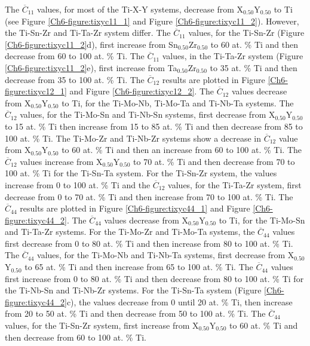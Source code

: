 The $\overline{C}_{11}$ values, for most of the Ti-X-Y systems, decrease from X$_{0.50}$Y$_{0.50}$ to Ti (see Figure \ref{Ch6-figure:tixyc11_1} and Figure \ref{Ch6-figure:tixyc11_2}). However, the Ti-Sn-Zr and Ti-Ta-Zr system differ. The $\overline{C}_{11}$ values, for the Ti-Sn-Zr (Figure \ref{Ch6-figure:tixyc11_2}d), first increase from Sn$_{0.50}$Zr$_{0.50}$ to 60 at. \% Ti and then decrease from 60 to 100 at. \% Ti. The $\overline{C}_{11}$ values, in the Ti-Ta-Zr system (Figure \ref{Ch6-figure:tixyc11_2}e), first increase from Ta$_{0.50}$Zr$_{0.50}$ to 35 at. \% Ti and then decrease from 35 to 100 at. \% Ti. The $\overline{C}_{12}$ results are plotted in Figure \ref{Ch6-figure:tixyc12_1} and Figure \ref{Ch6-figure:tixyc12_2}. The $\overline{C}_{12}$ values decrease from X$_{0.50}$Y$_{0.50}$ to Ti, for the Ti-Mo-Nb, Ti-Mo-Ta and Ti-Nb-Ta systems. The $\overline{C}_{12}$ values, for the Ti-Mo-Sn and Ti-Nb-Sn systems, first decrease from X$_{0.50}$Y$_{0.50}$ to 15 at. \% Ti then increase from 15 to 85 at. \% Ti and then decrease from 85 to 100 at. \% Ti. The Ti-Mo-Zr and Ti-Nb-Zr systems show a decrease in $\overline{C}_{12}$ value from X$_{0.50}$Y$_{0.50}$ to 60 at. \% Ti and then an increase from 60 to 100 at. \% Ti. The $\overline{C}_{12}$ values increase from X$_{0.50}$Y$_{0.50}$ to 70 at. \% Ti and then decrease from 70 to 100 at. \% Ti for the Ti-Sn-Ta system. For the Ti-Sn-Zr system, the values increase from 0 to 100 at. \% Ti and the $\overline{C}_{12}$ values, for the Ti-Ta-Zr system, first decrease from 0 to 70 at. \% Ti and then increase from 70 to 100 at. \% Ti. The $\overline{C}_{44}$ results are plotted in Figure \ref{Ch6-figure:tixyc44_1} and Figure \ref{Ch6-figure:tixyc44_2}. The $\overline{C}_{44}$ values decrease from X$_{0.50}$Y$_{0.50}$ to Ti, for the Ti-Mo-Sn and Ti-Ta-Zr systems. For the Ti-Mo-Zr and Ti-Mo-Ta systems, the $\overline{C}_{44}$ values first decrease from 0 to 80 at. \% Ti and then increase from 80 to 100 at. \% Ti. The $\overline{C}_{44}$ values, for the Ti-Mo-Nb and Ti-Nb-Ta systems, first decrease from X$_{0.50}$Y$_{0.50}$ to 65 at. \% Ti and then increase from 65 to 100 at. \% Ti. The $\overline{C}_{44}$ values first increase from 0 to 80 at. \% Ti and then decrease from 80 to 100 at. \% Ti for the Ti-Nb-Sn and Ti-Nb-Zr systems. For the Ti-Sn-Ta system (Figure \ref{Ch6-figure:tixyc44_2}c), the  values decrease from 0 until 20 at. \% Ti, then increase from 20 to 50 at. \% Ti and then decrease from 50 to 100 at. \% Ti. The $\overline{C}_{44}$ values, for the Ti-Sn-Zr system, first increase from X$_{0.50}$Y$_{0.50}$ to 60 at. \% Ti and then decrease from 60 to 100 at. \% Ti.

